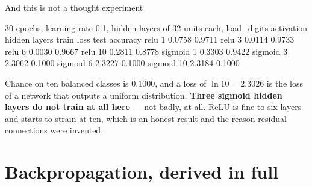 \documentclass[aspectratio=169]{beamer}
\begin{document}
\begin{frame}[fragile,shrink=6]{And this is not a thought experiment}
\begin{outblk}
30 epochs, learning rate 0.1, hidden layers of 32 units each, load_digits
  activation  hidden layers   train loss   test accuracy
   relu            1           0.0758        0.9711
   relu            3           0.0114        0.9733
   relu            6           0.0030        0.9667
   relu           10           0.2811        0.8778
   sigmoid         1           0.3303        0.9422
   sigmoid         3           2.3062        0.1000
   sigmoid         6           2.3227        0.1000
   sigmoid        10           2.3184        0.1000
\end{outblk}
  \begin{center}\small
    Chance on ten balanced classes is $0.1000$, and a loss of
    $\ln 10 = 2.3026$ is the loss of a network that outputs a uniform
    distribution. \textbf{Three sigmoid hidden layers do not train at all
    here} --- not badly, at all. ReLU is fine to six layers and starts to
    strain at ten, which is an honest result and the reason residual
    connections were invented.
  \end{center}
\end{frame}

\section[Backpropagation]{Backpropagation, derived in full}
\label{sec:bp}
\end{document}
